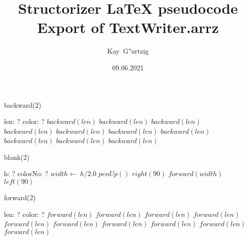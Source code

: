 \documentclass[a4paper,10pt]{article}
\title{Structorizer LaTeX pseudocode Export of TextWriter.arrz}
\author{Kay\ G"urtzig}
\date{09.06.2021}
\begin{document}
\begin{algorithm}
\caption{backward(2)}
\begin{algorithmic}[5]
    \State len: ?
    \State color: ?
  \EndDecl
      \State \(backward(len)\)
    \EndSelector
      \State \(backward(len)\)
    \EndSelector
      \State \(backward(len)\)
    \EndSelector
      \State \(backward(len)\)
    \EndSelector
      \State \(backward(len)\)
    \EndSelector
      \State \(backward(len)\)
    \EndSelector
      \State \(backward(len)\)
    \EndSelector
      \State \(backward(len)\)
    \EndSelector
      \State \(backward(len)\)
    \EndSelector
      \State \(backward(len)\)
    \EndSelector
  \EndCase
\EndProcedure
\end{algorithmic}
\end{algorithm}


\begin{algorithm}
\caption{blank(2)}
\begin{algorithmic}[5]
\State {}
    \State h: ?
    \State colorNo: ?
  \EndDecl
  \State \(width\gets\ h/2.0\)
  \State \(penUp()\)
  \State \(right(90)\)
  \State \(forward(width)\)
  \State \(left(90)\)
\EndProcedure
\end{algorithmic}
\end{algorithm}


\begin{algorithm}
\caption{forward(2)}
\begin{algorithmic}[5]
    \State len: ?
    \State color: ?
  \EndDecl
      \State \(forward(len)\)
    \EndSelector
      \State \(forward(len)\)
    \EndSelector
      \State \(forward(len)\)
    \EndSelector
      \State \(forward(len)\)
    \EndSelector
      \State \(forward(len)\)
    \EndSelector
      \State \(forward(len)\)
    \EndSelector
      \State \(forward(len)\)
    \EndSelector
      \State \(forward(len)\)
    \EndSelector
      \State \(forward(len)\)
    \EndSelector
      \State \(forward(len)\)
    \EndSelector
  \EndCase
\EndProcedure
\end{algorithmic}
\end{algorithm}
\end{document}
